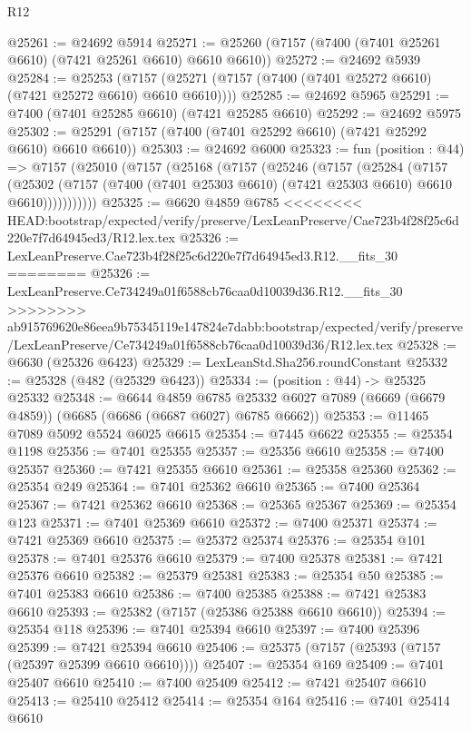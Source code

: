 \begin{lexlean}{R12}
\begin{coremodule}
{{{{{{{{{{{{{{{{{{{{{{{{{{{{{{{{{{{{{{{{{{{{{{{{{{{{{{{{{{{{{{{{{{{{{{{{{{{{{{{{{{@25261 := @24692 @5914
@25271 := @25260 (@7157 (@7400 (@7401 @25261 @6610) (@7421 @25261 @6610) @6610 @6610))
@25272 := @24692 @5939
@25284 := @25253
    (@7157 (@25271 (@7157 (@7400 (@7401 @25272 @6610) (@7421 @25272 @6610) @6610 @6610))))
@25285 := @24692 @5965
@25291 := @7400 (@7401 @25285 @6610) (@7421 @25285 @6610)
@25292 := @24692 @5975
@25302 := @25291 (@7157 (@7400 (@7401 @25292 @6610) (@7421 @25292 @6610) @6610 @6610))
@25303 := @24692 @6000
@25323 := fun (position : @44) =>
  @7157
    (@25010
      (@7157
        (@25168
          (@7157
            (@25246
              (@7157
                (@25284
                  (@7157
                    (@25302
                      (@7157 (@7400 (@7401 @25303 @6610) (@7421 @25303 @6610) @6610 @6610)))))))))))
@25325 := @6620 @4859 @6785
<<<<<<<< HEAD:bootstrap/expected/verify/preserve/LexLeanPreserve/Cae723b4f28f25c6d220e7f7d64945ed3/R12.lex.tex
@25326 := LexLeanPreserve.Cae723b4f28f25c6d220e7f7d64945ed3.R12.__fits_30
========
@25326 := LexLeanPreserve.Ce734249a01f6588cb76caa0d10039d36.R12.__fits_30
>>>>>>>> ab915769620e86eea9b75345119e147824e7dabb:bootstrap/expected/verify/preserve/LexLeanPreserve/Ce734249a01f6588cb76caa0d10039d36/R12.lex.tex
@25328 := @6630 (@25326 @6423)
@25329 := LexLeanStd.Sha256.roundConstant
@25332 := @25328 (@482 (@25329 @6423))
@25334 := (position : @44) -> @25325 @25332
@25348 := @6644
    @4859
    @6785
    @25332
    @6027
    @7089
    (@6669 (@6679 @4859))
    (@6685 (@6686 (@6687 @6027) @6785 @6662))
@25353 := @11465 @7089 @5092 @5524 @6025 @6615
@25354 := @7445 @6622
@25355 := @25354 @1198
@25356 := @7401 @25355
@25357 := @25356 @6610
@25358 := @7400 @25357
@25360 := @7421 @25355 @6610
@25361 := @25358 @25360
@25362 := @25354 @249
@25364 := @7401 @25362 @6610
@25365 := @7400 @25364
@25367 := @7421 @25362 @6610
@25368 := @25365 @25367
@25369 := @25354 @123
@25371 := @7401 @25369 @6610
@25372 := @7400 @25371
@25374 := @7421 @25369 @6610
@25375 := @25372 @25374
@25376 := @25354 @101
@25378 := @7401 @25376 @6610
@25379 := @7400 @25378
@25381 := @7421 @25376 @6610
@25382 := @25379 @25381
@25383 := @25354 @50
@25385 := @7401 @25383 @6610
@25386 := @7400 @25385
@25388 := @7421 @25383 @6610
@25393 := @25382 (@7157 (@25386 @25388 @6610 @6610))
@25394 := @25354 @118
@25396 := @7401 @25394 @6610
@25397 := @7400 @25396
@25399 := @7421 @25394 @6610
@25406 := @25375 (@7157 (@25393 (@7157 (@25397 @25399 @6610 @6610))))
@25407 := @25354 @169
@25409 := @7401 @25407 @6610
@25410 := @7400 @25409
@25412 := @7421 @25407 @6610
@25413 := @25410 @25412
@25414 := @25354 @164
@25416 := @7401 @25414 @6610
}}}}}}}}}}}}}}}}}}}}}}}}}}}}}}}}}}}}}}}}}}}}}}}}}}}}}}}}}}}}}}}}}}}}}}}}}}}}}}}}}}
\end{coremodule}
\end{lexlean}
